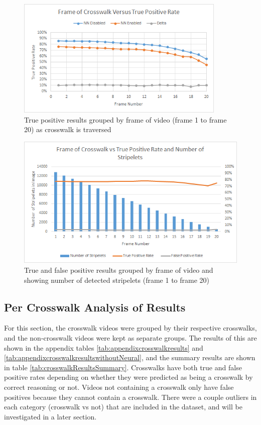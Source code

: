 \begin{figure}[t]
\begin{center}
\includegraphics[width=10cm]{figures/FrameResultsGraph.png}
\captionfonts
\caption{True positive results grouped by frame of video (frame 1 to frame 20) as crosswalk is traversed}
\label{fig:graphOfFrameCount}
\end{center}
\end{figure}

\begin{figure}[t]
\begin{center}
\includegraphics[width=12cm]{figures/NumStripeletsvsRates.png}
\captionfonts
\caption{True and false positive results grouped by frame of video and showing number of detected stripelets (frame 1 to frame 20)}
\label{fig:NumStripeletsvsRates}
\end{center}
\end{figure}

\clearpage

\subsection{Per Crosswalk Analysis of Results}

For this section, the crosswalk videos were grouped by their respective crosswalks, and the non-crosswalk videos were kept as separate groups. The results of this are shown in the appendix tables \ref{tab:appendixcrosswalkresults} and \ref{tab:appendixcrosswalkresultswithoutNeural}, and the summary results are shown in table \ref{tab:crosswalkResultsSummary}. Crosswalks have both true and false positive rates depending on whether they were predicted as being a crosswalk by correct reasoning or not. Videos not containing a crosswalk only have false positives because they cannot contain a crosswalk.  There were a couple outliers in each category (crosswalk vs not) that are included in the dataset, and will be investigated in a later section.

